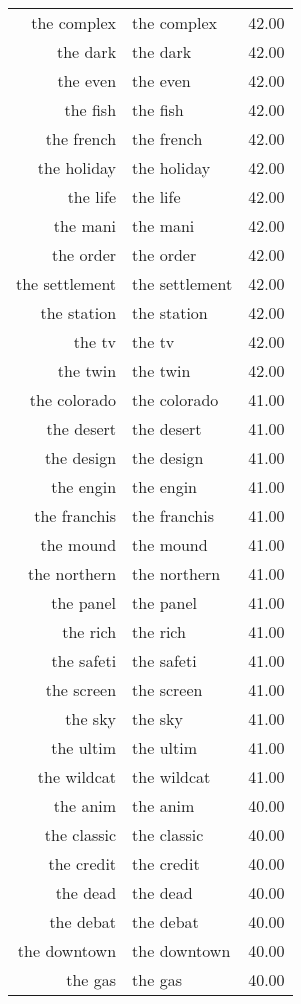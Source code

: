 \begin{table}[ht]
\begin{tabular}{rlr}
  the complex & the complex & 42.00 \\ 
  the dark & the dark & 42.00 \\ 
  the even & the even & 42.00 \\ 
  the fish & the fish & 42.00 \\ 
  the french & the french & 42.00 \\ 
  the holiday & the holiday & 42.00 \\ 
  the life & the life & 42.00 \\ 
  the mani & the mani & 42.00 \\ 
  the order & the order & 42.00 \\ 
  the settlement & the settlement & 42.00 \\ 
  the station & the station & 42.00 \\ 
  the tv & the tv & 42.00 \\ 
  the twin & the twin & 42.00 \\ 
  the colorado & the colorado & 41.00 \\ 
  the desert & the desert & 41.00 \\ 
  the design & the design & 41.00 \\ 
  the engin & the engin & 41.00 \\ 
  the franchis & the franchis & 41.00 \\ 
  the mound & the mound & 41.00 \\ 
  the northern & the northern & 41.00 \\ 
  the panel & the panel & 41.00 \\ 
  the rich & the rich & 41.00 \\ 
  the safeti & the safeti & 41.00 \\ 
  the screen & the screen & 41.00 \\ 
  the sky & the sky & 41.00 \\ 
  the ultim & the ultim & 41.00 \\ 
  the wildcat & the wildcat & 41.00 \\ 
  the anim & the anim & 40.00 \\ 
  the classic & the classic & 40.00 \\ 
  the credit & the credit & 40.00 \\ 
  the dead & the dead & 40.00 \\ 
  the debat & the debat & 40.00 \\ 
  the downtown & the downtown & 40.00 \\ 
  the gas & the gas & 40.00 \\ 

\end{tabular}
\end{table}
